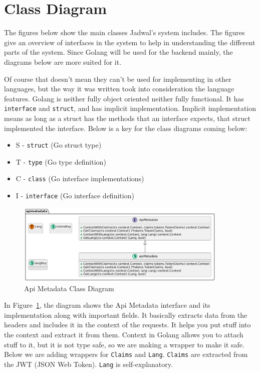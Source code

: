 \section{Class Diagram}

The figures below show the main classes Jadwal's system includes. The figures give an overview of interfaces in the system to help in understanding the different parts of the system. Since Golang will be used for the backend mainly, the diagrams below are more suited for it.

Of course that doesn't mean they can't be used for implementing in other languages, but the way it was written took into consideration the language features. Golang is neither fully object oriented neither fully functional. It has \texttt{interface} and \texttt{struct}, and has implicit implementation. Implicit implementation means as long as a struct has the methods that an interface expects, that struct implemented the interface. Below is a key for the class diagrams coming below:
\begin{itemize}
    \item S - \texttt{struct} (Go struct type)
    \item T - \texttt{type} (Go type definition)
    \item C - \texttt{class} (Go interface implementations)
    \item I - \texttt{interface} (Go interface definition)
\end{itemize}

\newpage

\begin{figure}[!h]
    \centering
    \includegraphics[width=0.9\textwidth]{images/docs/diagrams/class/class-diagram/apimetadata.png}
    \caption{Api Metadata Class Diagram}
    \label{fig:api-metadata-class-diagram}
\end{figure}

In Figure~\ref{fig:api-metadata-class-diagram}, the diagram shows the Api Metadata interface and its implementation along with important fields. It basically extracts data from the headers and includes it in the context of the requests. It helps you put stuff into the context and extract it from them. Context in Golang allows you to attach stuff to it, but it is not type safe, so we are making a wrapper to make it safe. Below we are adding wrappers for \texttt{Claims} and \texttt{Lang}. \texttt{Claims} are extracted from the JWT (JSON Web Token). \texttt{Lang} is self-explanatory.


